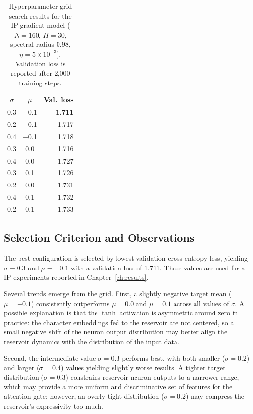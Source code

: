 \documentclass{sapthesis}
\begin{document}
\begin{table}[htbp]
  \centering
  \caption{Hyperparameter grid search results for the IP-gradient model ($N=160$, $H=30$, spectral radius 0.98, $\eta=5\times10^{-3}$). Validation loss is reported after 2{,}000 training steps.}
  \label{tab:grid-results}
  \begin{tabular}{ccr}
    \toprule
    $\sigma$ & $\mu$  & Val.\ loss     \\
    \midrule
    0.3      & $-$0.1 & \textbf{1.711} \\
    0.2      & $-$0.1 & 1.717          \\
    0.4      & $-$0.1 & 1.718          \\
    0.3      & 0.0    & 1.716          \\
    0.4      & 0.0    & 1.727          \\
    0.3      & 0.1    & 1.726          \\
    0.2      & 0.0    & 1.731          \\
    0.4      & 0.1    & 1.732          \\
    0.2      & 0.1    & 1.733          \\
    \bottomrule
  \end{tabular}
\end{table}

\subsection{Selection Criterion and Observations}
The best configuration is selected by lowest validation cross-entropy loss, yielding $\sigma = 0.3$ and $\mu = -0.1$ with a validation loss of 1.711. These values are used for all IP experiments reported in Chapter~\ref{ch:results}.

Several trends emerge from the grid. First, a slightly negative target mean ($\mu = -0.1$) consistently outperforms $\mu = 0.0$ and $\mu = 0.1$ across all values of $\sigma$. A possible explanation is that the $\tanh$ activation is asymmetric around zero in practice: the character embeddings fed to the reservoir are not centered, so a small negative shift of the neuron output distribution may better align the reservoir dynamics with the distribution of the input data.

Second, the intermediate value $\sigma = 0.3$ performs best, with both smaller ($\sigma = 0.2$) and larger ($\sigma = 0.4$) values yielding slightly worse results. A tighter target distribution ($\sigma = 0.3$) constrains reservoir neuron outputs to a narrower range, which may provide a more uniform and discriminative set of features for the attention gate; however, an overly tight distribution ($\sigma = 0.2$) may compress the reservoir's expressivity too much.
\end{document}

